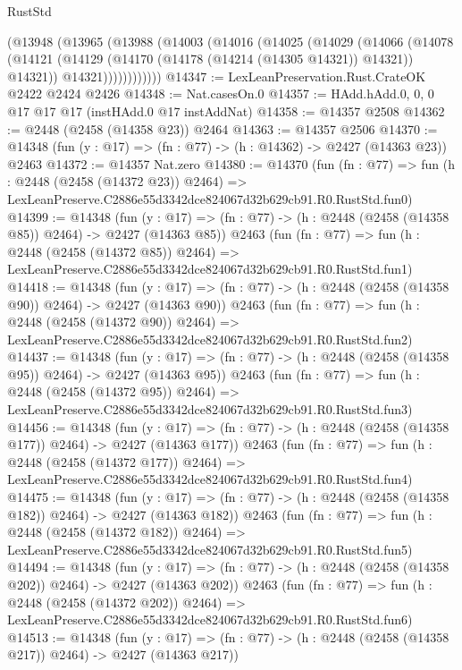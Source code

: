 \begin{lexlean}{RustStd}
\begin{coremodule}
          (@13948
            (@13965
              (@13988
                (@14003
                  (@14016
                    (@14025
                      (@14029
                        (@14066
                          (@14078
                            (@14121
                              (@14129 (@14170 (@14178 (@14214 (@14305 @14321)) @14321)) @14321))
                            @14321))))))))))))
@14347 := LexLeanPreservation.Rust.CrateOK @2422 @2424 @2426
@14348 := Nat.casesOn.{0}
@14357 := HAdd.hAdd.{0, 0, 0} @17 @17 @17 (instHAdd.{0} @17 instAddNat)
@14358 := @14357 @2508
@14362 := @2448 (@2458 (@14358 @23)) @2464
@14363 := @14357 @2506
@14370 := @14348 (fun (y : @17) => (fn : @77) -> (h : @14362) -> @2427 (@14363 @23)) @2463
@14372 := @14357 Nat.zero
@14380 := @14370
    (fun (fn : @77) =>
    fun (h : @2448 (@2458 (@14372 @23)) @2464) =>
    LexLeanPreserve.C2886e55d3342dce824067d32b629cb91.R0.RustStd.fun0)
@14399 := @14348
    (fun (y : @17) => (fn : @77) -> (h : @2448 (@2458 (@14358 @85)) @2464) -> @2427 (@14363 @85))
    @2463
    (fun (fn : @77) =>
    fun (h : @2448 (@2458 (@14372 @85)) @2464) =>
    LexLeanPreserve.C2886e55d3342dce824067d32b629cb91.R0.RustStd.fun1)
@14418 := @14348
    (fun (y : @17) => (fn : @77) -> (h : @2448 (@2458 (@14358 @90)) @2464) -> @2427 (@14363 @90))
    @2463
    (fun (fn : @77) =>
    fun (h : @2448 (@2458 (@14372 @90)) @2464) =>
    LexLeanPreserve.C2886e55d3342dce824067d32b629cb91.R0.RustStd.fun2)
@14437 := @14348
    (fun (y : @17) => (fn : @77) -> (h : @2448 (@2458 (@14358 @95)) @2464) -> @2427 (@14363 @95))
    @2463
    (fun (fn : @77) =>
    fun (h : @2448 (@2458 (@14372 @95)) @2464) =>
    LexLeanPreserve.C2886e55d3342dce824067d32b629cb91.R0.RustStd.fun3)
@14456 := @14348
    (fun (y : @17) => (fn : @77) -> (h : @2448 (@2458 (@14358 @177)) @2464) -> @2427 (@14363 @177))
    @2463
    (fun (fn : @77) =>
    fun (h : @2448 (@2458 (@14372 @177)) @2464) =>
    LexLeanPreserve.C2886e55d3342dce824067d32b629cb91.R0.RustStd.fun4)
@14475 := @14348
    (fun (y : @17) => (fn : @77) -> (h : @2448 (@2458 (@14358 @182)) @2464) -> @2427 (@14363 @182))
    @2463
    (fun (fn : @77) =>
    fun (h : @2448 (@2458 (@14372 @182)) @2464) =>
    LexLeanPreserve.C2886e55d3342dce824067d32b629cb91.R0.RustStd.fun5)
@14494 := @14348
    (fun (y : @17) => (fn : @77) -> (h : @2448 (@2458 (@14358 @202)) @2464) -> @2427 (@14363 @202))
    @2463
    (fun (fn : @77) =>
    fun (h : @2448 (@2458 (@14372 @202)) @2464) =>
    LexLeanPreserve.C2886e55d3342dce824067d32b629cb91.R0.RustStd.fun6)
@14513 := @14348
    (fun (y : @17) => (fn : @77) -> (h : @2448 (@2458 (@14358 @217)) @2464) -> @2427 (@14363 @217))

\end{coremodule}
\end{lexlean}
